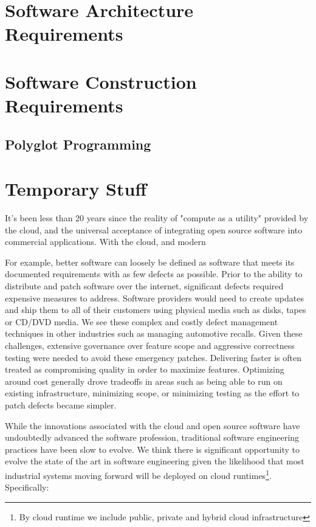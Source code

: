 \documentclass[conference]{IEEEconf}
\begin{document}
\section{Software Architecture Requirements}
\label{sec:SoftwareArchitecture}

\section{Software Construction Requirements}
\label{sec:SoftwareConstruction}

\subsection{Polyglot Programming}
\label{subsec:Polyglot}

\section{Temporary Stuff}
It's been less than 20 years since the reality of "compute as a utility" provided by the cloud, and the universal acceptance of integrating open source software into commercial applications. With the cloud, and modern 

For example, better software can loosely be defined as software that meets its documented requirements with as few defects as possible.  Prior to the ability to distribute and patch software over the internet, significant defects required expensive measures to address.  Software providers would need to create updates and ship them to all of their customers using physical media such as disks, tapes or CD/DVD media.  We see these complex and costly defect management techniques in other industries such as managing automotive recalls. Given these challenges, extensive governance over feature scope and aggressive correctness testing were needed to avoid these emergency patches.  Delivering faster is often treated as compromising quality in order to maximize features. Optimizing around cost generally drove tradeoffs in areas such as being able to run on existing infrastructure, minimizing scope, or minimizing testing as the effort to patch defects became simpler. 

While the innovations associated with the cloud and open source software have undoubtedly advanced the software profession, traditional software engineering practices have been slow to evolve.  We think there is significant opportunity to evolve the state of the art in software engineering given the likelihood that most industrial systems moving forward will be deployed on cloud runtimes\footnote{By cloud runtime we include public, private and hybrid cloud infrastructure}. Specifically:
\end{document}
